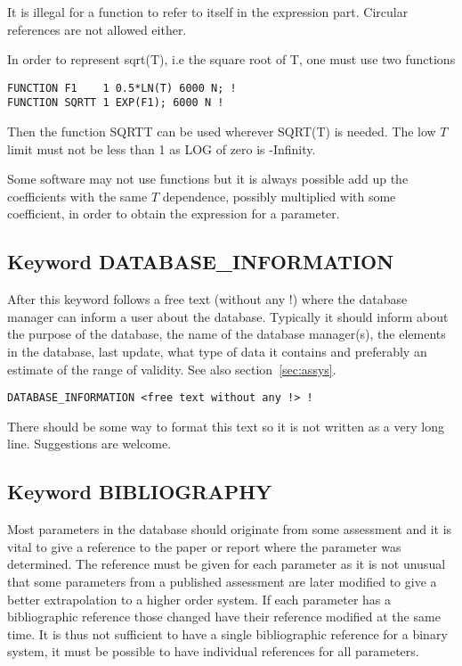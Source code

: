 \documentclass[12pt]{article}
\begin{document}
It is illegal for a function to refer to itself in the expression
part.  Circular references are not allowed either.

In order to represent sqrt(T), i.e the square root of T, one must use
two functions

\begin{verbatim}
FUNCTION F1    1 0.5*LN(T) 6000 N; !
FUNCTION SQRTT 1 EXP(F1); 6000 N !
\end{verbatim}

Then the function SQRTT can be used wherever SQRT(T) is needed.  The
low $T$ limit must not be less than 1 as LOG of zero is -Infinity.

Some software may not use functions but it is always possible add up
the coefficients with the same $T$ dependence, possibly multiplied
with some coefficient, in order to obtain the expression for a
parameter.

\subsection{Keyword DATABASE\_INFORMATION}\label{sec:info}

After this keyword follows a free text (without any !) where the
database manager can inform a user about the database.  Typically it
should inform about the purpose of the database, the name of the
database manager(s), the elements in the database, last update, what
type of data it contains and preferably an estimate of the range of
validity.  See also section~\ref{sec:assys}.

\begin{verbatim}
DATABASE_INFORMATION <free text without any !> !
\end{verbatim}

There should be some way to format this text so it is not written as a
very long line.  Suggestions are welcome.

\subsection{Keyword BIBLIOGRAPHY}\label{sec:bib}

Most parameters in the database should originate from some assessment
and it is vital to give a reference to the paper or report where the
parameter was determined.  The reference must be given for each
parameter as it is not unusual that some parameters from a published
assessment are later modified to give a better extrapolation to a
higher order system.  If each parameter has a bibliographic reference
those changed have their reference modified at the same time.  It is
thus not sufficient to have a single bibliographic reference for a
binary system, it must be possible to have individual references for
all parameters.
\end{document}
